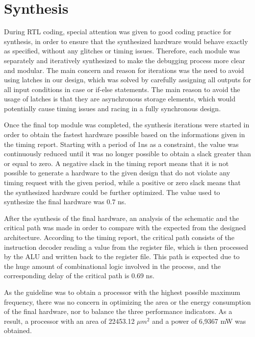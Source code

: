 \section{Synthesis}
\label{sec:synthesis}

During RTL coding, special attention was given to good coding practice for synthesis, in order to ensure that the synthesized hardware would behave exactly as specified, without any glitches or timing issues. Therefore, each module was separately and iteratively synthesized to make the debugging process more clear and modular. 
The main concern and reason for iterations was the need to avoid using latches in our design, which was solved by carefully assigning all outputs for all input conditions in case or if-else statements. The main reason to avoid the usage of latches is that they are asynchronous storage elements, which would potentially cause timing issues and racing in a fully synchronous design.

Once the final top module was completed, the synthesis iterations were started in order to obtain the fastest hardware possible based on the informations given in the timing report. Starting with a period of 1ns as a constraint, the value was continuously reduced until it was no longer possible to obtain a slack greater than or equal to zero. A negative slack in the timing report means that it is not possible to generate a hardware to the given design that do not violate any timing request with the given period, while a positive or zero slack means that the synthesized hardware could be further optimized.  The value used to synthesize the final hardware was 0.7 ns.

After the synthesis of the final hardware, an analysis of the schematic and the critical path was made in order to compare with the expected from the designed architecture. According to the timing report, the critical path consists of the instruction decoder reading a value from the register file, which is then processed by the ALU and written back to the register file. This path is expected due to the huge amount of combinational logic involved in the process, and the corresponding delay of the critical path is 0.69 ns.

As the guideline was to obtain a processor with the highest possible maximum frequency, there was no concern in optimizing the area or the energy consumption of the final hardware, nor to balance the three performance indicators. As a result, a processor with an area of 22453.12  $\mu m^{2}$ and a power of 6,9367 mW was obtained.